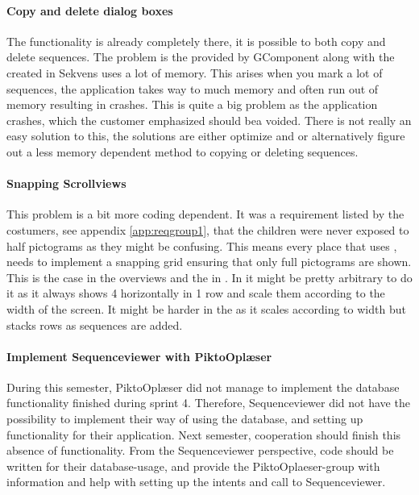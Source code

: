 \paragraph{Copy and delete dialog boxes} The functionality is already completely there, it is possible to both copy and delete sequences. The problem is the  provided by GComponent along with the  created in Sekvens uses a lot of memory. This arises when you mark a lot of sequences, the application takes way to much memory and often run out of memory resulting in crashes. This is quite a big problem as the application crashes, which the customer emphasized should bea voided. There is not really an easy solution to this, the solutions are either optimize  and  or alternatively figure out a less memory dependent method to copying or deleting sequences. 

\paragraph{Snapping Scrollviews} This problem is a bit more coding dependent. It was a requirement listed by the costumers, see appendix \ref{app:reqgroup1}, that the children were never exposed to half pictograms as they might be confusing. This means every place that uses , needs to implement a snapping grid ensuring that only full pictograms are shown. This is the case in the overviews  and the  in . In  it might be pretty arbitrary to do it as it always shows 4  horizontally in 1 row and scale them according to the width of the screen. It might be harder in the  as it scales according to width but stacks rows as sequences are added. 

\paragraph{Implement Sequenceviewer with PiktoOplæser}
During this semester, PiktoOplæser did not manage to implement the database functionality finished during sprint 4. Therefore, Sequenceviewer did not have the possibility to implement their way of using the database, and setting up functionality for their application. Next semester, cooperation should finish this absence of functionality. From the Sequenceviewer perspective, code should be written for their database-usage, and provide the PiktoOplaeser-group with information and help with setting up the intents and call to Sequenceviewer.

